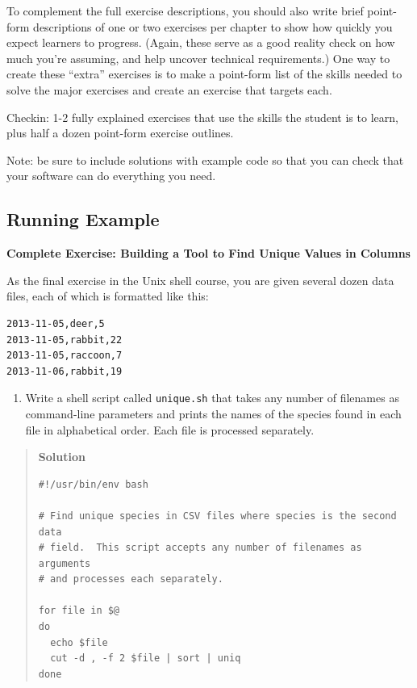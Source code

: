 \documentclass[10pt,statementpaper]{memoir}
\providecommand{\tightlist}{%
  \setlength{\itemsep}{0pt}\setlength{\parskip}{0pt}}
\begin{document}
To complement the full exercise descriptions, you should also write
brief point-form descriptions of one or two exercises per chapter to
show how quickly you expect learners to progress. (Again, these serve as
a good reality check on how much you're assuming, and help uncover
technical requirements.) One way to create these ``extra'' exercises is
to make a point-form list of the skills needed to solve the major
exercises and create an exercise that targets each.

Checkin: 1-2 fully explained exercises that use the skills the student
is to learn, plus half a dozen point-form exercise outlines.

Note: be sure to include solutions with example code so that you can
check that your software can do everything you need.

\subsection{Running Example}\label{running-example-2}

\textbf{Complete Exercise: Building a Tool to Find Unique Values in
Columns}

As the final exercise in the Unix shell course, you are given several
dozen data files, each of which is formatted like this:

\begin{verbatim}
2013-11-05,deer,5
2013-11-05,rabbit,22
2013-11-05,raccoon,7
2013-11-06,rabbit,19
\end{verbatim}

\begin{enumerate}
\def\labelenumi{\arabic{enumi}.}
\tightlist
\item
  Write a shell script called \texttt{unique.sh} that takes any number
  of filenames as command-line parameters and prints the names of the
  species found in each file in alphabetical order. Each file is
  processed separately.
\end{enumerate}

\begin{quote}
\textbf{Solution}

\begin{verbatim}
#!/usr/bin/env bash

# Find unique species in CSV files where species is the second data
# field.  This script accepts any number of filenames as arguments
# and processes each separately.

for file in $@
do
  echo $file
  cut -d , -f 2 $file | sort | uniq
done
\end{verbatim}
\end{quote}
\end{document}
